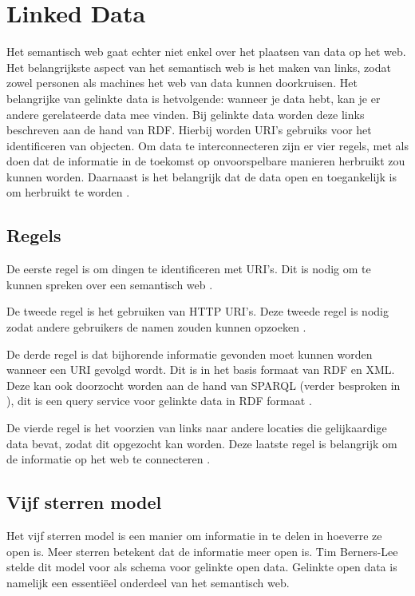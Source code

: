 \section{Linked Data}

Het semantisch web gaat echter niet enkel over het plaatsen van data op het web. Het belangrijkste aspect van het semantisch web is het maken van links, zodat zowel personen als machines het web van data kunnen doorkruisen. Het belangrijke van gelinkte data is hetvolgende: wanneer je data hebt, kan je er andere gerelateerde data mee vinden. Bij gelinkte data worden deze links beschreven aan de hand van RDF. Hierbij worden URI's gebruiks voor het identificeren van objecten. Om data te interconnecteren zijn er vier regels, met als doen dat de informatie in de toekomst op onvoorspelbare manieren herbruikt zou kunnen worden. Daarnaast is het belangrijk dat de data open en toegankelijk is om herbruikt te worden \cite{berners2006linkeddata}. 

\subsection{Regels}
De eerste regel is om dingen te identificeren met URI's. Dit is nodig om te kunnen spreken over een semantisch web \cite{berners2006linkeddata}. 

De tweede regel is het gebruiken van HTTP URI's. Deze tweede regel is nodig zodat andere gebruikers de namen zouden kunnen opzoeken \cite{berners2006linkeddata}. 

De derde regel is dat bijhorende informatie gevonden moet kunnen worden wanneer een URI gevolgd wordt. Dit is in het basis formaat van RDF en XML. Deze kan ook doorzocht worden aan de hand van SPARQL (verder besproken in ), dit is een query service voor gelinkte data in RDF formaat \cite{berners2006linkeddata}. 

De vierde regel is het voorzien van links naar andere locaties die gelijkaardige data bevat, zodat dit opgezocht kan worden. Deze laatste regel is belangrijk om de informatie op het web te connecteren \cite{berners2006linkeddata}.

\subsection{Vijf sterren model}
Het vijf sterren model is een manier om informatie in te delen in hoeverre ze open is. Meer sterren betekent dat de informatie meer open is. Tim Berners-Lee stelde dit model voor als schema voor gelinkte open data. Gelinkte open data is namelijk een essentiëel onderdeel van het semantisch web.

